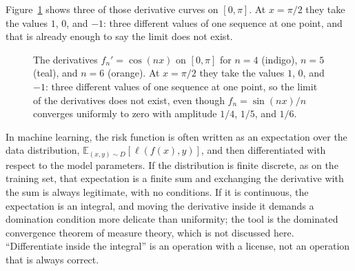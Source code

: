 Figure~\ref{fig:turunan} shows three of those derivative curves on $[0,\pi]$. At
$x=\pi/2$ they take the values $1$, $0$, and $-1$: three different values of one
sequence at one point, and that is already enough to say the limit does not exist.

\begin{figure}[htbp]
\centering
{}
\caption{The derivatives $f_n'=\cos(nx)$ on $[0,\pi]$ for $n=4$ (indigo), $n=5$
(teal), and $n=6$ (orange). At $x=\pi/2$ they take the values $1$, $0$, and $-1$: three
different values of one sequence at one point, so the limit of the derivatives does not exist,
even though $f_n=\sin(nx)/n$ converges uniformly to zero with amplitude $1/4$,
$1/5$, and $1/6$.}
\label{fig:turunan}
\end{figure}

\begin{catatan}
In machine learning, the risk function is often written as an expectation over the
data distribution, $\mathbb{E}_{(x,y)\sim D}[\ell(f(x),y)]$, and then differentiated
with respect to the model parameters. If the distribution is finite discrete, as on
the training set, that expectation is a finite sum and exchanging the derivative with
the sum is always legitimate, with no conditions. If it is continuous, the expectation is an integral, and
moving the derivative inside it demands a domination condition more delicate
than uniformity; the tool is the dominated convergence theorem of measure
theory, which is not discussed here. ``Differentiate inside the integral'' is an operation
with a license, not an operation that is always correct.
\end{catatan}

